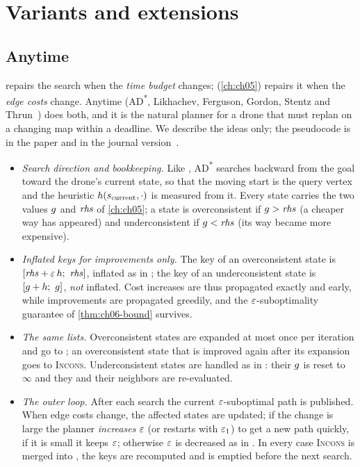 \section{Variants and extensions}
\label{sec:ch06-variants}

\subsection{Anytime \dstar}
\label{sec:ch06-anytime-dstar}

\arastar repairs the search when the \emph{time budget} changes; \dstarlite
(\cref{ch:ch05}) repairs it when the \emph{edge costs} change. Anytime
\dstar{} (AD\textsuperscript{*}, Likhachev, Ferguson, Gordon,
Stentz and Thrun~\cite{likhachev2005anytime}) does both, and it is the natural
planner for a drone that must replan on a changing map within a deadline. We
describe the ideas only; the pseudocode is in the paper and in the journal
version~\cite{likhachev2008anytime}.
\begin{itemize}
  \item \emph{Search direction and bookkeeping.} Like \dstarlite, AD\textsuperscript{*}
        searches backward from the goal toward the drone's current state,
        so that the moving start is the query vertex and the heuristic
        $h(s_{\mathrm{current}}, \cdot)$ is measured from it. Every
        state carries the two values $g$ and $\mathit{rhs}$ of \cref{ch:ch05};
        a state is overconsistent if $g > \mathit{rhs}$ (a cheaper way has
        appeared) and underconsistent if $g < \mathit{rhs}$ (its way became more
        expensive).
  \item \emph{Inflated keys for improvements only.} The key of an
        overconsistent state is $[\mathit{rhs} + \varepsilon\,h;\ \mathit{rhs}]$, inflated as in
        \arastar; the key of an underconsistent state is $[g + h;\
        g]$, \emph{not} inflated. Cost increases are thus propagated
        exactly and early, while improvements are propagated greedily, and
        the $\varepsilon$-suboptimality guarantee of \cref{thm:ch06-bound} survives.
  \item \emph{The same lists.} Overconsistent states are expanded at most
        once per iteration and go to \Closed; an overconsistent state that
        is improved again after its expansion goes to \textsc{Incons}.
        Underconsistent states are handled as in \dstarlite: their $g$
        is reset to $\infty$ and they and their neighbors are re-evaluated.
  \item \emph{The outer loop.} After each search the current
        $\varepsilon$-suboptimal path is published. When edge costs change, the
        affected states are updated; if the change is large the planner
        \emph{increases} $\varepsilon$ (or restarts with $\varepsilon_1$) to get a new path
        quickly, if it is small it keeps $\varepsilon$; otherwise $\varepsilon$ is decreased
        as in \arastar. In every case \textsc{Incons} is merged into \Open,
        the keys are recomputed and \Closed is emptied before the next
        search.
\end{itemize}
